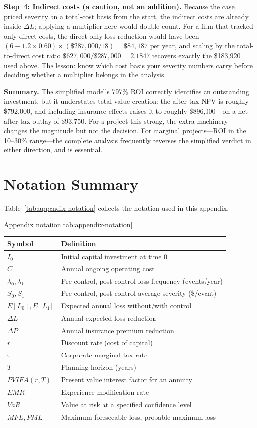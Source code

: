 \documentclass[11pt,openany]{book}
\begin{document}
\textbf{Step~4: Indirect costs (a caution, not an addition).} Because the case
priced severity on a total-cost basis from the start, the indirect costs are
already inside \(\Delta L\); applying a multiplier here would double count.
For a firm that tracked only direct costs, the direct-only loss reduction
would have been
\((6 - 1.2 \times 0.60) \times (\$287{,}000/18) = \$84{,}187\)
per year, and scaling by the total-to-direct cost ratio
\(\$627{,}000/\$287{,}000 = 2.1847\) recovers exactly the \$183{,}920 used
above. The lesson: know which cost basis
your severity numbers carry before deciding whether a multiplier belongs in
the analysis.

\textbf{Summary.} The simplified model's 797\% ROI correctly identifies an
outstanding investment, but it understates total value creation: the after-tax
NPV is roughly \$792{,}000, and including insurance effects raises it to
roughly \$896{,}000---on a net after-tax outlay of \$93{,}750. For a project
this strong, the extra machinery changes the magnitude but not the decision.
For marginal projects---ROI in the 10--30\% range---the complete analysis
frequently reverses the simplified verdict in either direction, and is
essential.

\section{Notation Summary}
\label{sec:appendix-notation}

Table~\ref{tab:appendix-notation} collects the notation used in this appendix.

\begin{ermtable}{Appendix notation}[tab:appendix-notation]
\begin{tabular}{@{}ll@{}}
\toprule
\textbf{Symbol} & \textbf{Definition} \\
\midrule
\(I_0\) & Initial capital investment at time 0 \\
\(C\) & Annual ongoing operating cost \\
\(\lambda_0, \lambda_1\) & Pre-control, post-control loss frequency
(events/year) \\
\(S_0, S_1\) & Pre-control, post-control average severity (\$/event) \\
\(E[L_0], E[L_1]\) & Expected annual loss without/with control \\
\(\Delta L\) & Annual expected loss reduction \\
\(\Delta P\) & Annual insurance premium reduction \\
\(r\) & Discount rate (cost of capital) \\
\(\tau\) & Corporate marginal tax rate \\
\(T\) & Planning horizon (years) \\
\(PVIFA(r,T)\) & Present value interest factor for an annuity \\
\(EMR\) & Experience modification rate \\
\(VaR\) & Value at risk at a specified confidence level \\
\(MFL, PML\) & Maximum foreseeable loss, probable maximum loss \\
\bottomrule
\end{tabular}
\end{ermtable}
\end{document}
